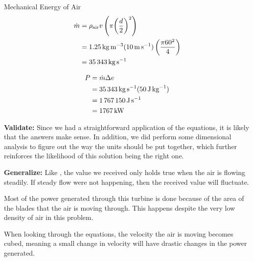 \begin{example}{Mechanical Energy of Air}
  \begin{align*}
    \dot{m} &= \rho_{\mathrm{air}} v \left( \pi {\left( \frac{d}{2} \right)}^{2} \right) \\
                     &= \SI{1.25}{\kilo\gram\per\cubic\meter} (\SI{10}{\meter\per\second}) \left( \frac{\pi 60^{2}}{4} \right) \\
                     &= \SI{35343}{\kilo\gram\per\second}
  \end{align*}

  \begin{align*}
    P &= \dot{m} \Delta e \\
           &= \SI{35343}{\kilo\gram\per\second} (\SI{50}{\joule\per\kilo\gram}) \\
           &= \SI{1767150}{\joule\per\second} \\
           &= \SI{1767}{\kilo\watt}
  \end{align*}

  \textbf{Validate:}
  Since we had a straightforward application of the equations, it is likely that the answers make sense.
  In addition, we did perform some dimensional analysis to figure out the way the units should be put together, which further reinforces the likelihood of this solution being the right one.

  \textbf{Generalize:}
  Like , the value we received only holds true when the air is flowing steadily.
  If steady flow were not happening, then the received value will fluctuate.

  Most of the power generated through this turbine is done because of the area of the blades that the air is moving through.
  This happens despite the very low density of air in this problem.

  When looking through the equations, the velocity the air is moving becomes cubed, meaning a small change in velocity will have drastic changes in the power generated.
\end{example}

